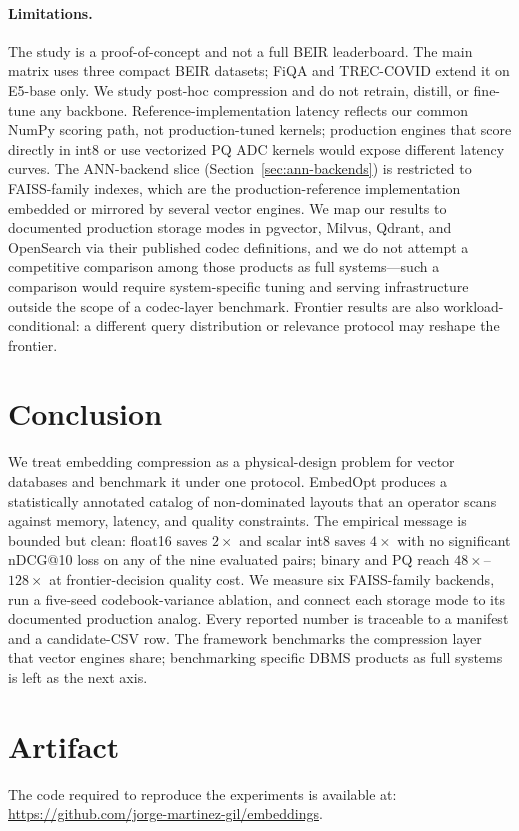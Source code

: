 \documentclass[sigconf]{acmart}
\makeatletter
\newcommand{\method}{EmbedOpt}
\newcommand{\ndcg}{nDCG@10}
\makeatother
\begin{document}
\paragraph{Limitations.}
The study is a proof-of-concept and not a full BEIR leaderboard. The main matrix uses three compact BEIR datasets; FiQA and TREC-COVID extend it on E5-base only. We study post-hoc compression and do not retrain, distill, or fine-tune any backbone. Reference-implementation latency reflects our common NumPy scoring path, not production-tuned kernels; production engines that score directly in int8 or use vectorized PQ ADC kernels would expose different latency curves. The ANN-backend slice (Section~\ref{sec:ann-backends}) is restricted to FAISS-family indexes, which are the production-reference implementation embedded or mirrored by several vector engines. We map our results to documented production storage modes in pgvector, Milvus, Qdrant, and OpenSearch via their published codec definitions, and we do not attempt a competitive comparison among those products as full systems---such a comparison would require system-specific tuning and serving infrastructure outside the scope of a codec-layer benchmark. Frontier results are also workload-conditional: a different query distribution or relevance protocol may reshape the frontier.

\section{Conclusion}
\label{sec:conclusion}

We treat embedding compression as a physical-design problem for vector databases and benchmark it under one protocol. \method{} produces a statistically annotated catalog of non-dominated layouts that an operator scans against memory, latency, and quality constraints. The empirical message is bounded but clean: float16 saves $2\times$ and scalar int8 saves $4\times$ with no significant \ndcg{} loss on any of the nine evaluated pairs; binary and PQ reach $48\times$--$128\times$ at frontier-decision quality cost. We measure six FAISS-family backends, run a five-seed codebook-variance ablation, and connect each storage mode to its documented production analog. Every reported number is traceable to a manifest and a candidate-CSV row. The framework benchmarks the compression layer that vector engines share; benchmarking specific DBMS products as full systems is left as the next axis.

\section*{Artifact}
The code required to reproduce the experiments is available at: \url{https://github.com/jorge-martinez-gil/embeddings}.
\end{document}
